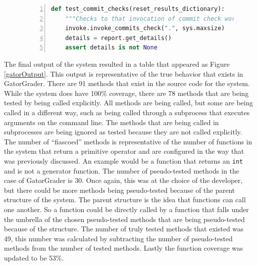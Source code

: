 \begin{figure}[H]
\begin{lstlisting}[language = Python, numbers = left,frame = single, caption = Test taken from GatorGrader., label = swallowedTest]
def test_commit_checks(reset_results_dictionary):
    """Checks to that invocation of commit check works correctly"""
    invoke.invoke_commits_check(".", sys.maxsize)
    details = report.get_details()
    assert details is not None
\end{lstlisting}
\end{figure}

The final output of the system resulted in a table that appeared as Figure \ref{gatorOutput}. This output is representative of the true behavior that exists in GatorGrader. There are 91 methods that exist in the source code for the system. While the system does have 100\% coverage, there are 78 methods that are being tested by being called explicitly. All methods are being called, but some are being called in a different way, such as being called through a subprocess that executes arguments on the command line. The methods that are being called in subprocesses are being ignored as tested because they are not called explicitly. The number of ``fiascoed'' methods is representative of the number of functions in the system that return a primitive operator and are configured in the way that was previously discussed. An example would be a function that returns an \texttt{int} and is not a generator function. The number of pseudo-tested methods in the case of GatorGrader is 30. Once again, this was at the choice of the developer, but there could be more methods being pseudo-tested because of the parent structure of the system. The parent structure is the idea that functions can call one another. So a function could be directly called by a function that falls under the umbrella of the chosen pseudo-tested methods that are being pseudo-tested because of the structure. The number of truly tested methods that existed was 49, this number was calculated by subtracting the number of pseudo-tested methods from the number of tested methods. Lastly the function coverage was updated to be 53\%.

